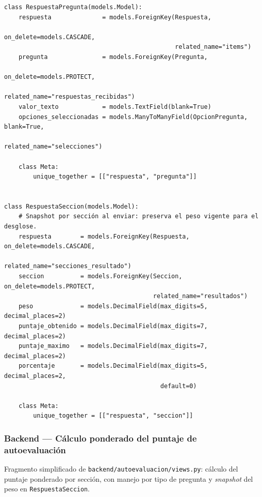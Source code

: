 \begin{lstlisting}[language={[3]Python}]
class RespuestaPregunta(models.Model):
    respuesta              = models.ForeignKey(Respuesta,
                                               on_delete=models.CASCADE,
                                               related_name="items")
    pregunta               = models.ForeignKey(Pregunta,
                                               on_delete=models.PROTECT,
                                               related_name="respuestas_recibidas")
    valor_texto            = models.TextField(blank=True)
    opciones_seleccionadas = models.ManyToManyField(OpcionPregunta, blank=True,
                                                    related_name="selecciones")

    class Meta:
        unique_together = [["respuesta", "pregunta"]]


class RespuestaSeccion(models.Model):
    # Snapshot por sección al enviar: preserva el peso vigente para el desglose.
    respuesta        = models.ForeignKey(Respuesta, on_delete=models.CASCADE,
                                         related_name="secciones_resultado")
    seccion          = models.ForeignKey(Seccion, on_delete=models.PROTECT,
                                         related_name="resultados")
    peso             = models.DecimalField(max_digits=5, decimal_places=2)
    puntaje_obtenido = models.DecimalField(max_digits=7, decimal_places=2)
    puntaje_maximo   = models.DecimalField(max_digits=7, decimal_places=2)
    porcentaje       = models.DecimalField(max_digits=5, decimal_places=2,
                                           default=0)

    class Meta:
        unique_together = [["respuesta", "seccion"]]
\end{lstlisting}

\subsubsection{Backend --- Cálculo ponderado del puntaje de autoevaluación}\label{lst:scoring}

Fragmento simplificado de \texttt{backend/autoevaluacion/views.py}: cálculo del puntaje ponderado por sección, con manejo por tipo de pregunta y \emph{snapshot} del peso en \texttt{RespuestaSeccion}.

